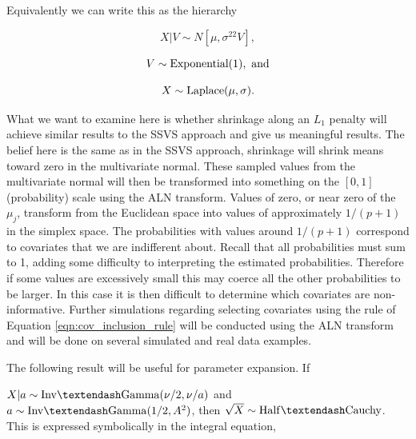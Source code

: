Equivalently we can write this as the hierarchy

\begin{equation}\label{eqn:normal_cond_lhood_lasso}
X \vert V \sim N[\mu, \sigma^22V],
\end{equation}

\begin{equation}\newnot{symbol:exponential_dist}
V \sim \text{Exponential}(1), \text{ and}
\end{equation}

\begin{equation}\newnot{symbol:laplace_dist}
X \sim \text{Laplace}(\mu, \sigma).
\end{equation}

What we want to examine here is whether shrinkage along an $L_1$ penalty will achieve similar results to the SSVS approach and give us meaningful results. The belief here is the same as in the SSVS approach, shrinkage will shrink means toward zero in the multivariate normal. These sampled values from the multivariate normal will then be transformed into something on the $[0,1]$ (probability) scale using the ALN transform. Values of zero, or near zero of the $\mu_j$, transform from the Euclidean space into values of approximately $1/(p+1)$ in the simplex space. The probabilities with values around $1/(p+1)$ correspond to covariates that we are indifferent about. Recall that all probabilities must sum to 1, adding some difficulty to interpreting the estimated probabilities. Therefore if some values are excessively small this may coerce all the other probabilities to be larger. In this case it is then difficult to determine which covariates are non-informative. Further simulations regarding selecting covariates using the rule of Equation \ref{eqn:cov_inclusion_rule} will be conducted using the ALN transform and will be done on several simulated and real data examples.    

The following result will be useful for parameter expansion. If 

$X\vert a \sim \mathrm{Inv\textendash Gamma}(\nu/2, \nu/a)$ and  $a \sim \mathrm{Inv\textendash Gamma}(1/2,A^2)$, then $\sqrt{X}\sim \mathrm{Half\textendash Cauchy}$. This is expressed symbolically in the integral equation,

